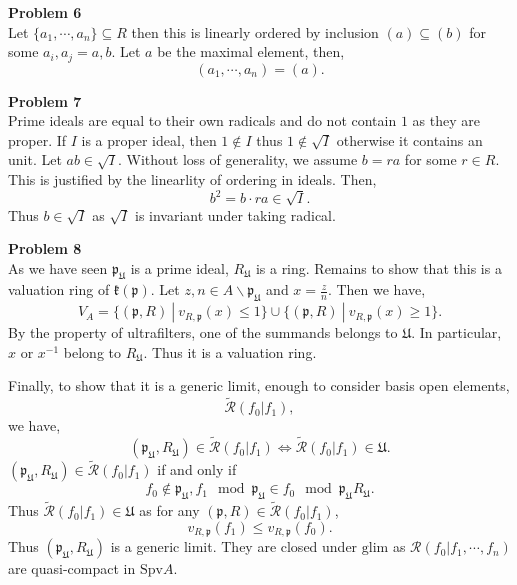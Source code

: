 \documentclass[10pt]{article}
\newcommand{\sep}[0]{\:|\:}
\newcommand{\p}[0]{\mathfrak{p}}
\newcommand{\U}[0]{\mathfrak{U}}
\begin{document}
\par\textbf{Problem 6}\\
Let $\{a_1,\cdots,a_n\}\subseteq R$ then this is linearly ordered by inclusion $(a)\subseteq (b)$ for some $a_i,a_j=a,b$. Let $a$ be the maximal element, then,
\begin{equation*}
    (a_1,\cdots,a_n) = (a).
\end{equation*}
\par\textbf{Problem 7}\\
Prime ideals are equal to their own radicals and do not contain $1$ as they are proper. If $I$ is a proper ideal, then $1\not\in I$ thus $1\not\in\sqrt{I}$ otherwise it contains an unit. Let $ab\in\sqrt{I}$. Without loss of generality, we assume $b=ra$ for some $r\in R$. This is justified by the linearlity of ordering in ideals. Then,
\begin{equation*}
    b^2 = b\cdot ra\in \sqrt{I}.
\end{equation*}
Thus $b\in\sqrt{I}$ as $\sqrt{I}$ is invariant under taking radical. 
\par\textbf{Problem 8}\\
As we have seen $\mathfrak{p}_\mathfrak{U}$ is a prime ideal, $R_\mathfrak{U}$ is a ring. Remains to show that this is a valuation ring of $\mathfrak{k}(\mathfrak{p})$. Let $z,n\in A \backslash \mathfrak{p}_\mathfrak{U}$ and $x = {\frac z n}$. Then we have,
\begin{equation*}
    V_A = \{(\p,R)\sep v_{R,\p}(x)\leq 1\}\cup \{(\p,R)\sep v_{R,\p}(x)\geq 1\}.
\end{equation*}
By the property of ultrafilters, one of the summands belongs to $\U$. In particular, $x$ or $x^{-1}$ belong to $R_\U$. Thus it is a valuation ring.
\par Finally, to show that it is a generic limit, enough to consider basis open elements,
\begin{equation*}
    \tilde{\mathcal{R}}(f_0|f_1),
\end{equation*}
we have,
\begin{equation*}
    (\p_\U,R_\U) \in \tilde{\mathcal{R}}(f_0|f_1)\iff \tilde{\mathcal{R}}(f_0|f_1)\in\U.
\end{equation*}
$(\p_\U,R_\U)\in \tilde{\mathcal{R}}(f_0|f_1)$ if and only if 
\begin{equation*}
    f_0\not\in \p_\U,f_1\mod{\p_\U}\in f_0\mod{\p_\U}R_\U.
\end{equation*}
Thus $\tilde{\mathcal{R}}(f_0|f_1)\in\U$ as for any $(\p,R)\in\tilde{\mathcal{R}}(f_0|f_1)$, 
\begin{equation*}
    v_{R,\p}(f_1)\leq v_{R,\p}(f_0).
\end{equation*}
Thus $(\p_\U,R_\U)$ is a generic limit. They are closed under $\text{glim}$ as $\mathcal{R}(f_0|f_1,\cdots,f_n)$ are quasi-compact in $\text{Spv}A$.
\end{document}
